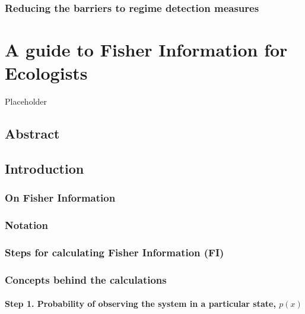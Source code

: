 \documentclass[12pt,twoside,openany]{reedthesis}
\begin{document}
\subsection{Reducing the barriers to regime detection
measures}\label{reducing-the-barriers-to-regime-detection-measures}

\chapter{A guide to Fisher Information for Ecologists}\label{fiGuide}

Placeholder

\section{Abstract}\label{abstract}

\section{Introduction}\label{introduction-1}

\subsection{On Fisher Information}\label{on-fisher-information}

\subsection{Notation}\label{notation}

\subsection{Steps for calculating Fisher Information
(FI)}\label{steps-for-calculating-fisher-information-fi}

\subsection{Concepts behind the
calculations}\label{concepts-behind-the-calculations}

\subsubsection{\texorpdfstring{\textbf{Step 1. Probability of observing
the system in a particular state,
\(p(x)\)}}{Step 1. Probability of observing the system in a particular state, p(x)}}\label{step-1.-probability-of-observing-the-system-in-a-particular-state-px}
\end{document}
